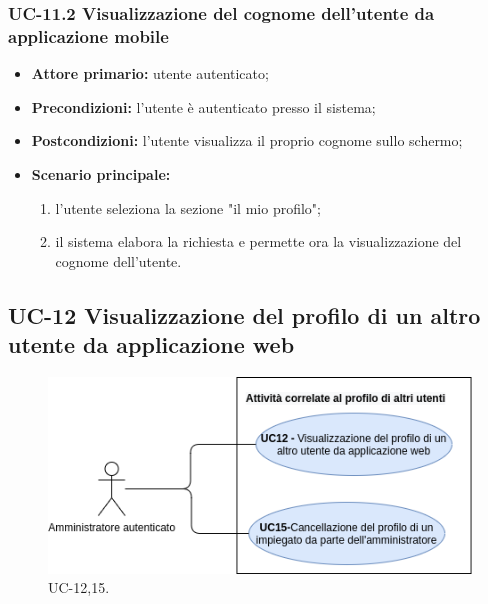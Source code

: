 \subsubsection{UC-11.2 Visualizzazione del cognome dell'utente da applicazione mobile}
\begin{itemize}
	\item \textbf{Attore primario:} utente autenticato;

	\item \textbf{Precondizioni:} l'utente è autenticato presso il sistema;

	\item \textbf{Postcondizioni:} l'utente visualizza il proprio cognome sullo schermo;

	\item \textbf{Scenario principale:}
		\begin{enumerate}
    	\item  l'utente seleziona la sezione "il mio profilo";
    	\item  il sistema elabora la richiesta e permette ora la visualizzazione del cognome dell'utente.
		\end{enumerate}
\end{itemize}


\subsection{UC-12 Visualizzazione del profilo di un altro utente da applicazione web}

\begin{figure}[H]
	\centering
	\includegraphics[width=\textwidth]{src/CasiDUso/immagini/AttivitaAdmin.png}
	\caption{UC-12,15.}
\end{figure}

